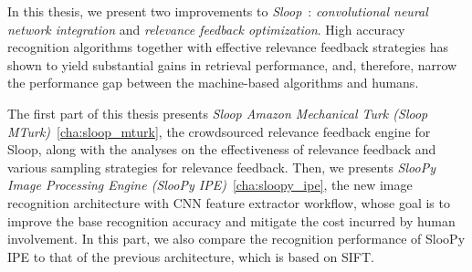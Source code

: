 In this thesis, we present two improvements to \emph{Sloop}~\cite{sloop15}:
\emph{convolutional neural network integration} and \emph{relevance feedback
optimization}. High accuracy recognition algorithms together with effective
relevance feedback strategies has shown to yield substantial gains in retrieval
performance, and, therefore, narrow the performance gap between the
machine-based algorithms and humans.

The first part of this thesis presents \emph{Sloop Amazon Mechanical Turk (Sloop
MTurk)}~\ref{cha:sloop_mturk}, the crowdsourced relevance feedback engine for
Sloop, along with the analyses on the effectiveness of relevance feedback and
various sampling strategies for relevance feedback.  Then, we presents
\emph{SlooPy Image Processing Engine (SlooPy IPE)}~\ref{cha:sloopy_ipe}, the new
image recognition architecture with CNN feature extractor workflow, whose goal
is to improve the base recognition accuracy and mitigate the cost incurred by
human involvement.  In this part, we also compare the recognition performance of
SlooPy IPE to that of the previous architecture, which is based on SIFT.

